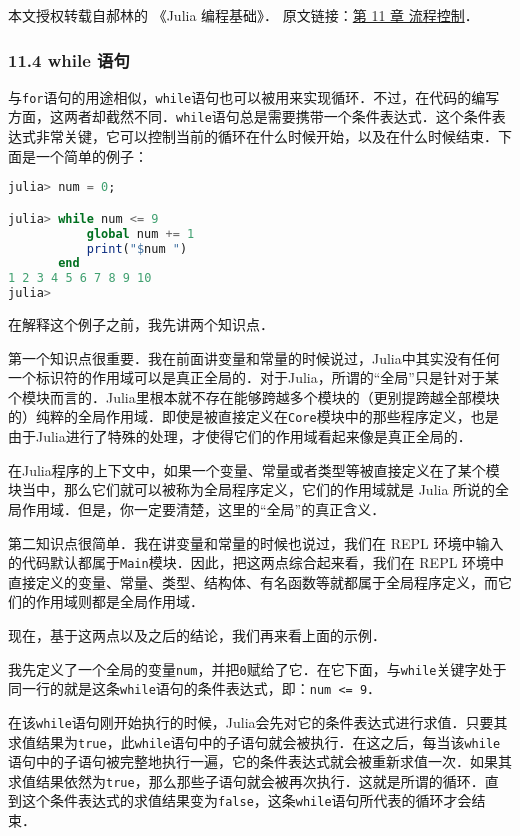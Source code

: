 
本文授权转载自郝林的 《Julia 编程基础》． 原文链接：\href{https://github.com/hyper0x/JuliaBasics/blob/master/book/ch11.md}{第 11 章 流程控制}．


\subsubsection{11.4 while 语句}

与\verb|for|语句的用途相似，\verb|while|语句也可以被用来实现循环．不过，在代码的编写方面，这两者却截然不同．\verb|while|语句总是需要携带一个条件表达式．这个条件表达式非常关键，它可以控制当前的循环在什么时候开始，以及在什么时候结束．下面是一个简单的例子：

\begin{lstlisting}[language=julia]
julia> num = 0;

julia> while num <= 9 
           global num += 1 
           print("$num ") 
       end
1 2 3 4 5 6 7 8 9 10 
julia> 
\end{lstlisting}

在解释这个例子之前，我先讲两个知识点．

第一个知识点很重要．我在前面讲变量和常量的时候说过，Julia中其实没有任何一个标识符的作用域可以是真正全局的．对于Julia，所谓的“全局”只是针对于某个模块而言的．Julia里根本就不存在能够跨越多个模块的（更别提跨越全部模块的）纯粹的全局作用域．即使是被直接定义在\verb|Core|模块中的那些程序定义，也是由于Julia进行了特殊的处理，才使得它们的作用域看起来像是真正全局的．

在Julia程序的上下文中，如果一个变量、常量或者类型等被直接定义在了某个模块当中，那么它们就可以被称为全局程序定义，它们的作用域就是 Julia 所说的全局作用域．但是，你一定要清楚，这里的“全局”的真正含义．

第二知识点很简单．我在讲变量和常量的时候也说过，我们在 REPL 环境中输入的代码默认都属于\verb|Main|模块．因此，把这两点综合起来看，我们在 REPL 环境中直接定义的变量、常量、类型、结构体、有名函数等就都属于全局程序定义，而它们的作用域则都是全局作用域．

现在，基于这两点以及之后的结论，我们再来看上面的示例．

我先定义了一个全局的变量\verb|num|，并把\verb|0|赋给了它．在它下面，与\verb|while|关键字处于同一行的就是这条\verb|while|语句的条件表达式，即：\verb|num <= 9|．

在该\verb|while|语句刚开始执行的时候，Julia会先对它的条件表达式进行求值．只要其求值结果为\verb|true|，此\verb|while|语句中的子语句就会被执行．在这之后，每当该\verb|while|语句中的子语句被完整地执行一遍，它的条件表达式就会被重新求值一次．如果其求值结果依然为\verb|true|，那么那些子语句就会被再次执行．这就是所谓的循环．直到这个条件表达式的求值结果变为\verb|false|，这条\verb|while|语句所代表的循环才会结束．

